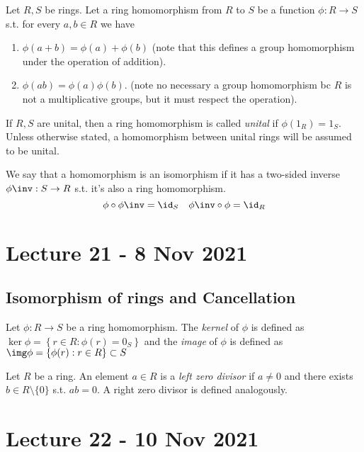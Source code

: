 \documentclass[11pt]{scrartcl}
\begin{document}
\begin{definition}
  Let $R,S$ be rings. Let a ring homomorphism from $R$ to $S$ be a function $\phi:R\to S$
  s.t. for every $a,b\in R$ we have
  \begin{enumerate}
    \item $\phi(a+b)=\phi(a)+\phi(b)$ (note that this defines a group homomorphism under
      the operation of addition).
    \item $\phi(ab)=\phi(a)\phi(b)$. (note no necessary a group homomorphism bc $R$ is not
      a multiplicative groups, but it must respect the operation).
  \end{enumerate}
  If $R,S$ are unital, then a ring homomorphism is called \emph{unital} if
  $\phi(1_R)=1_S$. Unless otherwise stated, a homomorphism between unital rings will be
  assumed to be unital.

  We say that a homomorphism is an isomorphism if it has a two-sided inverse
  $\phi\inv:S\to R$ s.t. it's also a ring homomorphism.
  \[\phi \circ \phi\inv = \id_S \quad \phi\inv\circ\phi = \id_R\]
  \label{def:ringHomUnital}
\end{definition}

\section{Lecture 21 - 8 Nov 2021}

\subsection{Isomorphism of rings and Cancellation}

\begin{definition}
  Let $\phi:R\to S$ be a ring homomorphism. The \emph{kernel} of $\phi$ is defined as
  $\ker\phi=\left\{ r\in R : \phi(r)=0_S \right\}$ and the \emph{image} of $\phi$ is
  defined as $\img\phi=\left\{ \phi(r) : r\in R \right\}\subset S$
\end{definition}

\begin{definition}
  Let $R$ be a ring. An element $a\in R$ is a \emph{left zero divisor} if $a\neq 0$ and
  there exists $b\in R\setminus \{0\}$ s.t. $ab=0$. A right zero divisor is defined
  analogously.
\end{definition}

\section{Lecture 22 - 10 Nov 2021}
\end{document}

